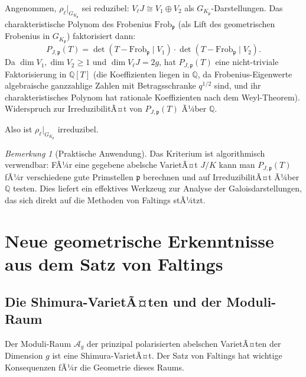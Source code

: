 ﻿\documentclass[12pt,a4paper]{article}
\theoremstyle{plain}
\theoremstyle{definition}
\theoremstyle{remark}
\newtheorem{remark}[theorem]{Bemerkung}
\newenvironment{proof*}[1][Beweis]{%
  \begin{proof}[#1]\renewcommand{\qedsymbol}{$\blacksquare$}}
  {\end{proof}}
\newcommand{\Q}{\mathbb{Q}}
\begin{document}
\begin{proof*}
Angenommen, $\rho_\ell|_{G_{K_\mathfrak{p}}}$ sei reduzibel:
$V_\ell J \cong V_1 \oplus V_2$ als $G_{K_\mathfrak{p}}$-Darstellungen.
Das charakteristische Polynom des Frobenius $\mathrm{Frob}_\mathfrak{p}$
(als Lift des geometrischen Frobenius in $G_{K_\mathfrak{p}}$) faktorisiert dann:
\[
  P_{J,\mathfrak{p}}(T) = \det(T - \mathrm{Frob}_\mathfrak{p} \mid V_1)
  \cdot \det(T - \mathrm{Frob}_\mathfrak{p} \mid V_2).
\]
Da $\dim V_1, \dim V_2 \geq 1$ und $\dim V_\ell J = 2g$, hat
$P_{J,\mathfrak{p}}(T)$ eine nicht-triviale Faktorisierung in $\Q[T]$
(die Koeffizienten liegen in $\Q$, da Frobenius-Eigenwerte algebraische
ganzzahlige Zahlen mit Betragsschranke $q^{1/2}$ sind, und ihr charakteristisches
Polynom hat rationale Koeffizienten nach dem Weyl-Theorem).
Widerspruch zur IrreduzibilitÃ¤t von $P_{J,\mathfrak{p}}(T)$ Ã¼ber $\Q$.

Also ist $\rho_\ell|_{G_{K_\mathfrak{p}}}$ irreduzibel.
\end{proof*}

\begin{remark}[Praktische Anwendung]\label{rem:praktisch}
Das Kriterium ist algorithmisch verwendbar: FÃ¼r eine gegebene abelsche VarietÃ¤t $J/K$
kann man $P_{J,\mathfrak{p}}(T)$ fÃ¼r verschiedene gute Primstellen $\mathfrak{p}$
berechnen und auf IrreduzibilitÃ¤t Ã¼ber $\Q$ testen.
Dies liefert ein effektives Werkzeug zur Analyse der Galoisdarstellungen,
das sich direkt auf die Methoden von Faltings stÃ¼tzt.
\end{remark}

\section{Neue geometrische Erkenntnisse aus dem Satz von Faltings}

\subsection{Die Shimura-VarietÃ¤ten und der Moduli-Raum}

Der Moduli-Raum $\mathcal{A}_g$ der prinzipal polarisierten abelschen VarietÃ¤ten der Dimension $g$
ist eine Shimura-VarietÃ¤t. Der Satz von Faltings hat wichtige Konsequenzen fÃ¼r die
Geometrie dieses Raums.
\end{document}
